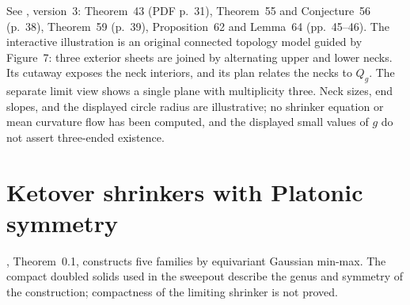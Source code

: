 \begin{example}
\begin{itemize}
\end{itemize}
See \cite{CatHMW2026}, version~3: Theorem~43 (PDF p.~31), Theorem~55 and Conjecture~56 (p.~38), Theorem~59 (p.~39), Proposition~62 and Lemma~64 (pp.~45--46). The interactive illustration is an original connected topology model guided by Figure~7: three exterior sheets are joined by alternating upper and lower necks. Its cutaway exposes the neck interiors, and its plan relates the necks to $Q_g$. The separate limit view shows a single plane with multiplicity three. Neck sizes, end slopes, and the displayed circle radius are illustrative; no shrinker equation or mean curvature flow has been computed, and the displayed small values of $g$ do not assert three-ended existence.
\end{example}

\chapter{Ketover shrinkers with Platonic symmetry}\label{sec:catalogue-ketover-platonic}
\cite{CatKetover2016}, Theorem~0.1, constructs five families by
equivariant Gaussian min-max. The compact doubled solids used in the
sweepout describe the genus and symmetry of the construction; compactness
of the limiting shrinker is not proved.


